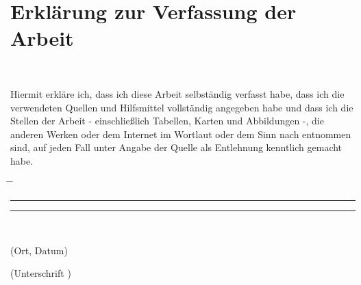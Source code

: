 \chapter*{Erklärung zur Verfassung der Arbeit}

\tuinfthesisauthor\\
\tuinfthesisauthoraddress

\vspace*{1.2cm}

Hiermit erkläre ich, dass ich diese Arbeit selbständig verfasst habe, 
dass ich die verwendeten Quellen und Hilfsmittel vollständig angegeben 
habe und dass ich die Stellen der Arbeit - einschließlich Tabellen, 
Karten und Abbildungen -, die anderen Werken oder dem Internet im 
Wortlaut oder dem Sinn nach entnommen sind, auf jeden Fall unter Angabe 
der Quelle als Entlehnung kenntlich gemacht habe.\\

\vspace*{2cm}
\begin{tabbing}%
    \hspace{58mm} \= \hspace{28mm} \= \hspace{58mm} \kill
    {\raggedright\rule{58mm}{0.5pt}} \> \> {\raggedright\rule{58mm}{0.5pt}} \\
    \begin{minipage}[t][0.5cm][t]{58mm}
	\vspace{0pt} %
	\thesistitlefontnormalsize
	\centering (Ort, Datum)
    \end{minipage}
    \> \>
    \begin{minipage}[t][0.5cm][t]{58mm}
	\vspace{0pt} %
	\thesistitlefontnormalsize
	\centering (Unterschrift \tuinfthesisverfassung)
    \end{minipage}
\end{tabbing}

